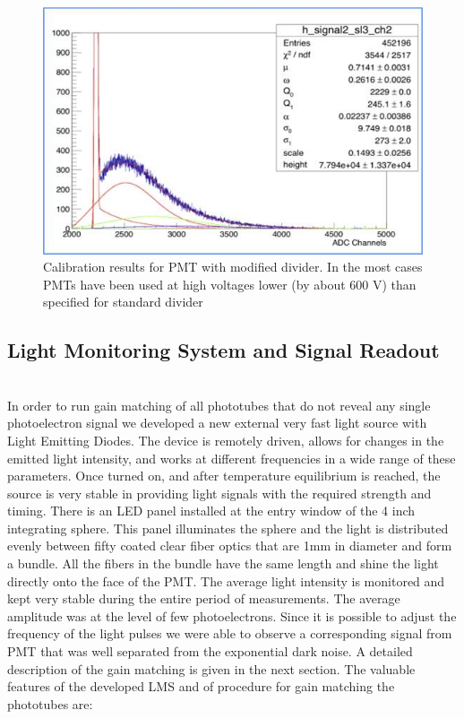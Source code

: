  \begin{figure}[!h]
    \centering
    \includegraphics[width=1.0\linewidth,trim={0.0cm 0.0cm 0.0cm 0.0cm},clip]{images/POPOV_4.jpg}
    \caption{Calibration results for PMT with modified divider. In the most cases PMTs have been used at high voltages lower (by about 600 V) than specified for standard divider}
    \label{fig:POPOV_4}
\end{figure}

\subsection{Light Monitoring System and Signal Readout}
\indent
 \\
 \indent In order to run gain matching of all phototubes that do not reveal any single photoelectron signal we developed a new external very fast light source with Light Emitting Diodes. The device is remotely driven, allows for changes in the emitted light intensity, and works at different frequencies in a wide range of these parameters. Once turned on, and after temperature equilibrium is reached, the source is very stable in providing light signals with the required strength and timing. There is an LED panel installed at the entry window of the 4 inch integrating sphere. This panel illuminates the sphere and the light is distributed evenly between fifty coated clear fiber optics that are 1mm in diameter and form a bundle. All the fibers in the bundle have the same length and shine the light directly onto the face of the PMT. The average light intensity is monitored and kept very stable during the entire period of measurements. The average amplitude was at the level of few photoelectrons. Since it is possible to adjust the frequency of the light pulses we were able to observe a corresponding signal from PMT that was well separated from the exponential dark noise. A detailed description of the gain matching is given in the next section. The valuable features of the developed LMS and of procedure for gain matching the phototubes are:
 
